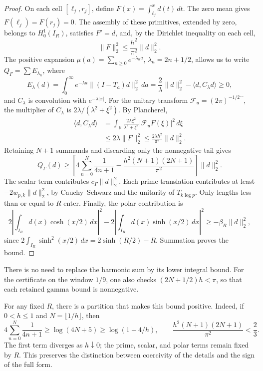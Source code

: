 \begin{proof}
On each cell \([\ell_j,r_j]\), define
\(F(x)=\int_{\ell_j}^x d(t)\,dt\). The zero mean gives
\(F(\ell_j)=F(r_j)=0\). The assembly of these primitives, extended
by zero, belongs to \(H_0^1(I_R)\), satisfies \(F'=d\), and, by
the Dirichlet inequality on each cell,
\begin{equation}
\|F\|_2^2\leq\frac{h^2}{\pi^2}\|d\|_2^2.
\label{viii:schur-add-primitiva}
\end{equation}
The positive expansion
\(\mu(a)=\sum_{n\geq0}e^{-\lambda_n a}\), \(\lambda_n=2n+1/2\),
allows us to write \(Q_\Gamma=\sum E_{\lambda_n}\), where
\begin{equation}
E_\lambda(d)=\int_0^\infty e^{-\lambda a}
 \|(I-T_a)d\|_2^2\,da
 =\frac2\lambda\|d\|_2^2-\langle d,C_\lambda d\rangle\geq0,
\label{viii:schur-add-energia-lambda}
\end{equation}
and \(C_\lambda\) is convolution with \(e^{-\lambda|x|}\).
For the unitary transform
\(\mathcal F_u=(2\pi)^{-1/2}\widehat{\phantom f}\), the multiplier
of \(C_\lambda\) is \(2\lambda/(\lambda^2+\xi^2)\). By Plancherel,
\begin{equation}
\begin{aligned}
\langle d,C_\lambda d\rangle
&=\int_{\mathbb R}\frac{2\lambda\xi^2}{\lambda^2+\xi^2}
 |\mathcal F_uF(\xi)|^2\,d\xi\\
&\leq2\lambda\|F\|_2^2
 \leq\frac{2\lambda h^2}{\pi^2}\|d\|_2^2 .
\end{aligned}
\label{viii:schur-add-cota-convolucion}
\end{equation}
Retaining \(N+1\) summands and discarding only the nonnegative tail gives
\[
Q_\Gamma(d)\geq
\left[4\sum_{n=0}^N\frac1{4n+1}
-\frac{h^2(N+1)(2N+1)}{\pi^2}\right]\|d\|_2^2.
\]
The scalar term contributes \(c_\Gamma\|d\|_2^2\).
Each prime translation contributes at least
\(-2w_{p,k}\|d\|_2^2\), by Cauchy--Schwarz and the unitarity
of \(T_{k\log p}\). Only lengths less than or equal to
\(R\) enter.
Finally, the polar contribution is
\[
2\left|\int_{I_R}d(x)\cosh(x/2)\,dx\right|^2
-2\left|\int_{I_R}d(x)\sinh(x/2)\,dx\right|^2
\geq-\beta_R\|d\|_2^2,
\]
since \(2\int_{I_R}\sinh^2(x/2)\,dx=2\sinh(R/2)-R\).
Summation proves the bound.
\end{proof}
There is no need to replace the harmonic sum by its lower integral bound.
For the certificate on the window \(1/9\), one also checks
\((2N+1/2)h<\pi\), so that each retained gamma bound is nonnegative.

For any fixed \(R\), there is a partition that makes this
bound positive. Indeed, if \(0<h\leq1\) and \(N=\lfloor1/h\rfloor\), then
\[
4\sum_{n=0}^N\frac1{4n+1}\geq\log(4N+5)\geq\log(1+4/h),
\qquad
\frac{h^2(N+1)(2N+1)}{\pi^2}<\frac23.
\]
The first term diverges as \(h\downarrow0\); the prime,
scalar, and polar terms remain fixed by \(R\). This preserves
the distinction between coercivity of the details and the sign of the
full form.

